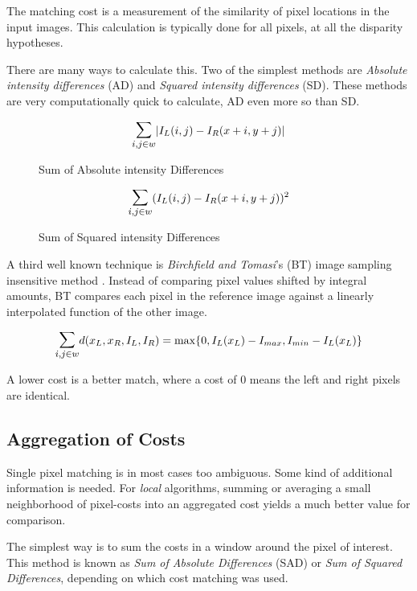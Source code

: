 The matching cost is a measurement of the similarity of pixel
locations in the input images. This calculation is typically done for
all pixels, at all the disparity hypotheses.

There are many ways to calculate this. Two of the simplest methods are
\textit{Absolute intensity differences} (AD) and \textit{Squared
  intensity differences} (SD). These methods are very computationally
quick to calculate, AD even more so than SD.


\begin{figure}
  \label{eq:sad}
  \[ \mathlarger{\mathlarger{\sum}}_{i,j \in w} |I_L(i,j) - I_R(x + i, y + j)| \]
  \caption{Sum of Absolute intensity Differences}
\end{figure}


\begin{figure}
  \label{eq:ssd}
  \[ \mathlarger{\mathlarger{\sum}}_{i,j \in w} (I_L(i,j) - I_R(x + i, y + j))^2 \]
  \caption{Sum of Squared intensity Differences}
\end{figure}

A third well known technique is \textit{Birchfield and Tomasi}'s (BT)
image sampling insensitive method \cite{bt}. Instead of comparing
pixel values shifted by integral amounts, BT compares each pixel in
the reference image against a linearly interpolated function of the
other image.

\begin{equation}
  \label{eq:bt}
  \mathlarger{\mathlarger{\sum}}_{i,j \in w} d(x_L, x_R, I_L, I_R) = \max\{0, I_L(x_L) - I_{max}, I_{min} - I_L(x_L) \}
\end{equation}


A lower cost is a better match, where a cost of 0 means the left and
right pixels are identical.

\subsection{Aggregation of Costs}
\label{sec:aggregatecost}

Single pixel matching is in most cases too ambiguous. Some kind of
additional information is needed. For \textit{local} algorithms,
summing or averaging a small neighborhood of pixel-costs into an
aggregated cost yields a much better value for comparison.

The simplest way is to sum the costs in a window around the pixel of
interest. This method is known as \textit{Sum of Absolute Differences}
(SAD) or \textit{Sum of Squared Differences}, depending on which cost
matching was used.

